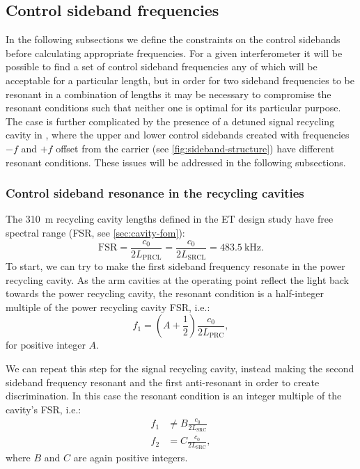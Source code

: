 \subsection{\label{sec:control-sideband-freqs}Control sideband frequencies}
In the following subsections we define the constraints on the control sidebands before calculating appropriate frequencies. For a given interferometer it will be possible to find a set of control sideband frequencies any of which will be acceptable for a particular length, but in order for two sideband frequencies to be resonant in a combination of lengths it may be necessary to compromise the resonant conditions such that neither one is optimal for its particular purpose. The case is further complicated by the presence of a detuned signal recycling cavity in \ETLF{}, where the upper and lower control sidebands created with frequencies $-f$ and $+f$ offset from the carrier (see \cref{fig:sideband-structure}) have different resonant conditions. These issues will be addressed in the following subsections.

\subsubsection{Control sideband resonance in the recycling cavities}
The \SI{310}{\meter} recycling cavity lengths defined in the \gls{ET} design study have free spectral range (\gls{FSR}, see \cref{sec:cavity-fom}):
\begin{equation}
  \text{FSR} = \frac{c_0}{2 L_{\text{PRCL}}} = \frac{c_0}{2 L_{\text{SRCL}}} = \SI{483.5}{\kilo\hertz}.
\end{equation}
To start, we can try to make the first sideband frequency resonate in the power recycling cavity. As the arm cavities at the operating point reflect the light back towards the power recycling cavity, the resonant condition is a half-integer multiple of the power recycling cavity \gls{FSR}, i.e.:
\begin{equation}
  \label{eq:prc-fsr}
  f_1 = \left(A + \frac{1}{2} \right) \frac{c_0}{2 L_{\text{PRC}}},
\end{equation}
for positive integer $A$.

We can repeat this step for the signal recycling cavity, instead making the second sideband frequency resonant and the first anti-resonant in order to create discrimination. In this case the resonant condition is an integer multiple of the cavity's \gls{FSR}, i.e.:
\begin{equation}
  \label{eq:src-fsr}
  \begin{split}
    f_1 &\neq B \frac{c_0}{2 L_{\text{SRC}}} \\
    f_2 &= C \frac{c_0}{2 L_{\text{SRC}}},
  \end{split}
\end{equation}
where $B$ and $C$ are again positive integers.


